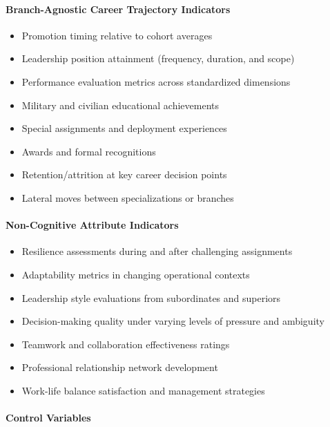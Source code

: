 \documentclass[./main.tex]{subfiles}
\begin{document}
\paragraph{Branch-Agnostic Career Trajectory
Indicators}\label{branch-agnostic-career-trajectory-indicators}

\begin{itemize}
\tightlist
\item
  Promotion timing relative to cohort averages
\item
  Leadership position attainment (frequency, duration, and scope)
\item
  Performance evaluation metrics across standardized dimensions
\item
  Military and civilian educational achievements
\item
  Special assignments and deployment experiences
\item
  Awards and formal recognitions
\item
  Retention/attrition at key career decision points
\item
  Lateral moves between specializations or branches
\end{itemize}

\paragraph{Non-Cognitive Attribute
Indicators}\label{non-cognitive-attribute-indicators}

\begin{itemize}
\tightlist
\item
  Resilience assessments during and after challenging assignments
\item
  Adaptability metrics in changing operational contexts
\item
  Leadership style evaluations from subordinates and superiors
\item
  Decision-making quality under varying levels of pressure and ambiguity
\item
  Teamwork and collaboration effectiveness ratings
\item
  Professional relationship network development
\item
  Work-life balance satisfaction and management strategies
\end{itemize}

\paragraph{Control Variables}\label{control-variables}
\end{document}
